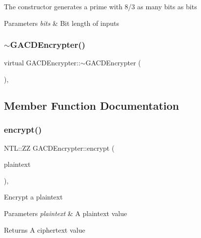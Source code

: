 The constructor generates a prime with 8/3 as many bits as {\ttfamily bits} 
\begin{DoxyParams}{Parameters}
{\em bits} & Bit length of inputs \\
\hline
\end{DoxyParams}
\mbox{\label{classGACDEncrypter_a257b4b64e312222137fd351ce34fcf2e}} 
\subsubsection{\texorpdfstring{$\sim$\+G\+A\+C\+D\+Encrypter()}{~GACDEncrypter()}}
{\footnotesize\ttfamily virtual G\+A\+C\+D\+Encrypter\+::$\sim$\+G\+A\+C\+D\+Encrypter (\begin{DoxyParamCaption}{ }\end{DoxyParamCaption})\hspace{0.3cm}{\ttfamily [inline]}, {\ttfamily [virtual]}}



\subsection{Member Function Documentation}
\mbox{\label{classGACDEncrypter_a310a857f6b77a6c83d4319968d49902f}} 
\subsubsection{\texorpdfstring{encrypt()}{encrypt()}}
{\footnotesize\ttfamily N\+T\+L\+::\+ZZ G\+A\+C\+D\+Encrypter\+::encrypt (\begin{DoxyParamCaption}\item[{N\+T\+L\+::\+ZZ \&}]{plaintext }\end{DoxyParamCaption})\hspace{0.3cm}{\ttfamily [override]}, {\ttfamily [virtual]}}

Encrypt a plaintext 
\begin{DoxyParams}{Parameters}
{\em plaintext} & A plaintext value \\
\hline
\end{DoxyParams}
\begin{DoxyReturn}{Returns}
A ciphertext value 
\end{DoxyReturn}


